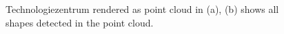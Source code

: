 \begin{figure}
\centering
{}
\caption{Technologiezentrum rendered as point cloud in (a), (b) shows all shapes detected in the point cloud. }
\label{fig:technologiezentrum_results}
\end{figure}

